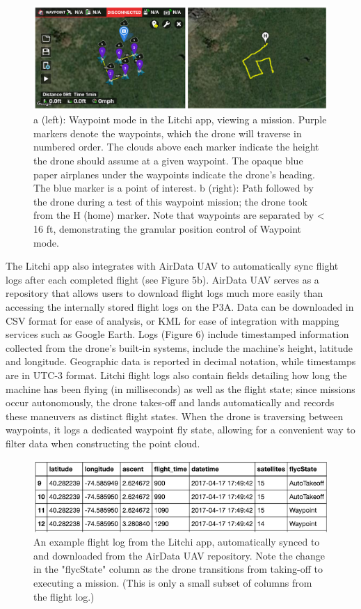 \documentclass[pageno]{jpaper}
\begin{document}
\begin{figure}[h]
	\caption[Waypoints missions in the Litchi app]{a (left): Waypoint mode in the Litchi app, viewing a mission. Purple markers denote the waypoints, which the drone will traverse in numbered order. The clouds above each marker indicate the height the drone should assume at a given waypoint. The opaque blue paper airplanes under the waypoints indicate the drone's heading. The blue marker is a point of interest. b (right): Path followed by the drone during a test of this waypoint mission; the drone took from the H (home) marker. Note that waypoints are separated by < 16 ft, demonstrating the granular position control of Waypoint mode.}
	\includegraphics{waypoint}
	\centering
\end{figure}

The Litchi app also integrates with AirData UAV to automatically sync flight logs after each completed flight (see Figure 5b). AirData UAV serves as a repository that allows users to download flight logs much more easily than accessing the internally stored flight logs on the P3A. Data can be downloaded in CSV format for ease of analysis, or KML for ease of integration with mapping services such as Google Earth. Logs (Figure 6) include timestamped information collected from the drone's built-in systems, include the machine's height, latitude and longitude. Geographic data is reported in decimal notation, while timestamps are in UTC-3 format. Litchi flight logs also contain fields detailing how long the machine has been flying (in milliseconds) as well as the flight state; since missions occur autonomously, the drone takes-off and lands automatically and records these maneuvers as distinct flight states. When the drone is traversing between waypoints, it logs a dedicated waypoint fly state, allowing for a convenient way to filter data when constructing the point cloud. 

\begin{figure}[h]
	\caption[Example flight log from the Litchi app.]{An example flight log from the Litchi app, automatically synced to and downloaded from the AirData UAV repository. Note the change in the "flycState" column as the drone transitions from taking-off to executing a mission. (This is only a small subset of columns from the flight log.)}
	\includegraphics{flight_log}
	\centering
\end{figure}
\end{document}
